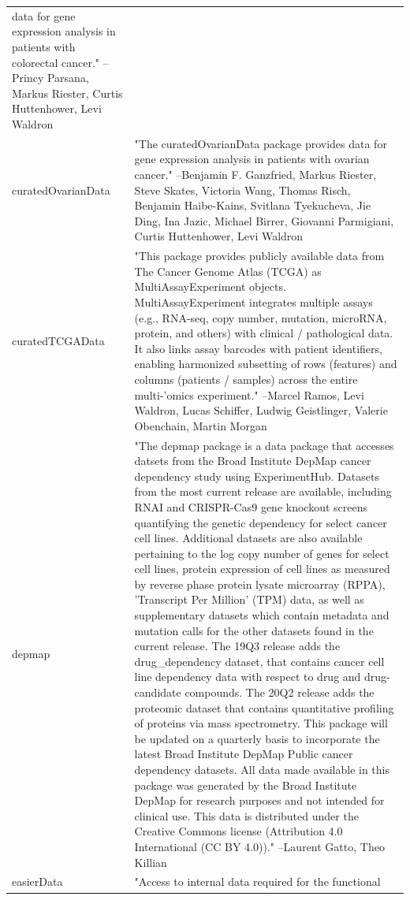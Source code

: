 \begin{longtable}[t]{l>{\raggedright\arraybackslash}p{25em}}
data for gene expression analysis in patients with colorectal
cancer." --Princy Parsana, Markus Riester, Curtis Huttenhower, Levi Waldron\\
curatedOvarianData & "The curatedOvarianData package provides data for gene
expression analysis in patients with ovarian cancer." --Benjamin F. Ganzfried, Markus Riester, Steve Skates, Victoria Wang, Thomas Risch, Benjamin Haibe-Kains, Svitlana Tyekucheva, Jie Ding, Ina Jazic, Michael Birrer, Giovanni Parmigiani, Curtis Huttenhower, Levi Waldron\\
curatedTCGAData & "This package provides publicly available data from The
Cancer Genome Atlas (TCGA) as MultiAssayExperiment objects.
MultiAssayExperiment integrates multiple assays (e.g., RNA-seq,
copy number, mutation, microRNA, protein, and others) with
clinical / pathological data. It also links assay barcodes with
patient identifiers, enabling harmonized subsetting of rows
(features) and columns (patients / samples) across the entire
multi-'omics experiment." --Marcel Ramos, Levi Waldron, Lucas Schiffer, Ludwig Geistlinger, Valerie Obenchain, Martin Morgan\\
depmap & "The depmap package is a data package that accesses datsets
from the Broad Institute DepMap cancer dependency study using
ExperimentHub. Datasets from the most current release are
available, including RNAI and CRISPR-Cas9 gene knockout screens
quantifying the genetic dependency for select cancer cell
lines. Additional datasets are also available pertaining to the
log copy number of genes for select cell lines, protein
expression of cell lines as measured by reverse phase protein
lysate microarray (RPPA), 'Transcript Per Million' (TPM) data,
as well as supplementary datasets which contain metadata and
mutation calls for the other datasets found in the current
release. The 19Q3 release adds the drug\_dependency dataset,
that contains cancer cell line dependency data with respect to
drug and drug-candidate compounds. The 20Q2 release adds the
proteomic dataset that contains quantitative profiling of
proteins via mass spectrometry. This package will be updated on
a quarterly basis to incorporate the latest Broad Institute
DepMap Public cancer dependency datasets. All data made
available in this package was generated by the Broad Institute
DepMap for research purposes and not intended for clinical use.
This data is distributed under the Creative Commons license
(Attribution 4.0 International (CC BY 4.0))." --Laurent Gatto, Theo Killian\\
\addlinespace
easierData & "Access to internal data required for the functional

\end{longtable}
